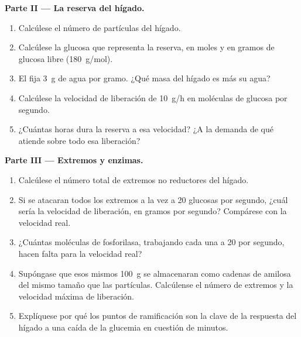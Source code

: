 \begin{problem}
\medskip
\noindent\textbf{Parte II --- La reserva del hígado.}
\begin{enumerate}[resume]
  \item Calcúlese el número de partículas del hígado.
  \item Calcúlese la glucosa que representa la reserva, en moles y en
        gramos de glucosa libre (\qty{180}{g/mol}).
  \item El  fija \qty{3}{g} de agua por gramo. ¿Qué masa del
        hígado es  más su agua?
  \item Calcúlese la velocidad de liberación de \qty{10}{g/h} en moléculas
        de glucosa por segundo.
  \item ¿Cuántas horas dura la reserva a esa velocidad? ¿A la demanda de
        qué  atiende sobre todo esa liberación?
\end{enumerate}

\medskip
\noindent\textbf{Parte III --- Extremos y enzimas.}
\begin{enumerate}[resume]
  \item Calcúlese el número total de extremos no reductores del hígado.
  \item Si se atacaran todos los extremos a la vez a \qty{20}{} glucosas
        por segundo, ¿cuál sería la velocidad de liberación, en gramos por
        segundo? Compárese con la velocidad real.
  \item ¿Cuántas moléculas de fosforilasa, trabajando cada una a
        \qty{20}{} por segundo, hacen falta para la velocidad real?
  \item Supóngase que esos mismos \qty{100}{g} se almacenaran como cadenas
        de amilosa del mismo tamaño que las partículas. Calcúlense el
        número de extremos y la velocidad máxima de liberación.
  \item Explíquese por qué los puntos de ramificación son la clave de la
        respuesta del hígado a una caída de la glucemia en cuestión de
        minutos.
\end{enumerate}


\end{problem}

